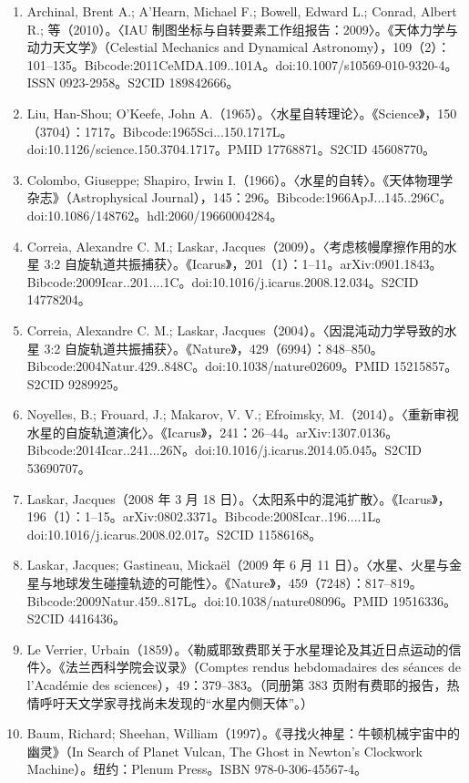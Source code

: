 \begin{enumerate}
    \item Archinal, Brent A.; A'Hearn, Michael F.; Bowell, Edward L.; Conrad, Albert R.; 等（2010）。〈IAU 制图坐标与自转要素工作组报告：2009〉。《天体力学与动力天文学》（Celestial Mechanics and Dynamical Astronomy），109（2）：101–135。Bibcode:2011CeMDA.109..101A。doi:10.1007/s10569-010-9320-4。ISSN 0923-2958。S2CID 189842666。
    \item Liu, Han-Shou; O'Keefe, John A.（1965）。〈水星自转理论〉。《Science》，150（3704）：1717。Bibcode:1965Sci...150.1717L。doi:10.1126/science.150.3704.1717。PMID 17768871。S2CID 45608770。
    \item Colombo, Giuseppe; Shapiro, Irwin I.（1966）。〈水星的自转〉。《天体物理学杂志》（Astrophysical Journal），145：296。Bibcode:1966ApJ...145..296C。doi:10.1086/148762。hdl:2060/19660004284。
    \item Correia, Alexandre C. M.; Laskar, Jacques（2009）。〈考虑核幔摩擦作用的水星 3:2 自旋轨道共振捕获〉。《Icarus》，201（1）：1–11。arXiv:0901.1843。Bibcode:2009Icar..201....1C。doi:10.1016/j.icarus.2008.12.034。S2CID 14778204。
    \item Correia, Alexandre C. M.; Laskar, Jacques（2004）。〈因混沌动力学导致的水星 3:2 自旋轨道共振捕获〉。《Nature》，429（6994）：848–850。Bibcode:2004Natur.429..848C。doi:10.1038/nature02609。PMID 15215857。S2CID 9289925。
    \item Noyelles, B.; Frouard, J.; Makarov, V. V.; Efroimsky, M.（2014）。〈重新审视水星的自旋轨道演化〉。《Icarus》，241：26–44。arXiv:1307.0136。Bibcode:2014Icar..241...26N。doi:10.1016/j.icarus.2014.05.045。S2CID 53690707。
    \item Laskar, Jacques（2008 年 3 月 18 日）。〈太阳系中的混沌扩散〉。《Icarus》，196（1）：1–15。arXiv:0802.3371。Bibcode:2008Icar..196....1L。doi:10.1016/j.icarus.2008.02.017。S2CID 11586168。
    \item Laskar, Jacques; Gastineau, Mickaël（2009 年 6 月 11 日）。〈水星、火星与金星与地球发生碰撞轨迹的可能性〉。《Nature》，459（7248）：817–819。Bibcode:2009Natur.459..817L。doi:10.1038/nature08096。PMID 19516336。S2CID 4416436。
    \item Le Verrier, Urbain（1859）。〈勒威耶致费耶关于水星理论及其近日点运动的信件〉。《法兰西科学院会议录》（Comptes rendus hebdomadaires des séances de l'Académie des sciences），49：379–383。（同册第 383 页附有费耶的报告，热情呼吁天文学家寻找尚未发现的“水星内侧天体”。）
    \item Baum, Richard; Sheehan, William（1997）。《寻找火神星：牛顿机械宇宙中的幽灵》（In Search of Planet Vulcan, The Ghost in Newton's Clockwork Machine）。纽约：Plenum Press。ISBN 978-0-306-45567-4。

\end{enumerate}
